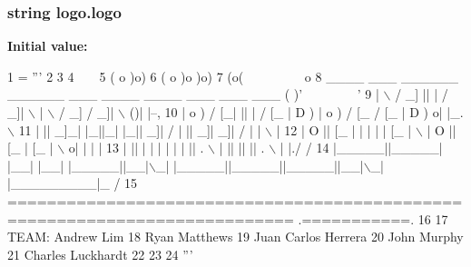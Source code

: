 \subsubsection[{logo}]{\setlength{\rightskip}{0pt plus 5cm}string logo.\+logo}\label{namespacelogo_a9117d4fd978070a512c10339dc4132ca}
{\bfseries Initial value\+:}
\begin{DoxyCode}
1 = \textcolor{stringliteral}{'''}
2 \textcolor{stringliteral}{}
3 \textcolor{stringliteral}{}
4 \textcolor{stringliteral}{                                                                                    ~  ~           }
5 \textcolor{stringliteral}{                                                                                  ( o )o)          }
6 \textcolor{stringliteral}{                                                                                ( o )o  )o)       }
7 \textcolor{stringliteral}{                                                                               (o( ~~~~~~~~~o      }
8 \textcolor{stringliteral}{      \_\_\_\_     \_\_\_ \_\_\_\_\_\_  \_\_\_\_\_\_    \_\_\_  \_\_\_\_       \_\_\_\_     \_\_\_    \_\_\_  \_\_\_  ( )' ~~~~~~~~'      }
9 \textcolor{stringliteral}{     |    \(\backslash\)   /  \_]      ||      |  /  \_]|    \(\backslash\)     |    \(\backslash\)   /  \_]  /  \_]|    \(\backslash\) ()|         |--,   }
10 \textcolor{stringliteral}{     |  o  ) /  [\_|      ||      | /  [\_ |  D  )    |  o  ) /  [\_  /  [\_ |  D  ) o|         |\_. \(\backslash\)  }
11 \textcolor{stringliteral}{     |     ||    \_]\_|  |\_||\_|  |\_||    \_]|    /     |     ||    \_]|    \_]|    /   |         |  \(\backslash\) | }
12 \textcolor{stringliteral}{     |  O  ||   [\_  |  |    |  |  |   [\_ |    \(\backslash\)     |  O  ||   [\_ |   [\_ |    \(\backslash\)  o|         |  | | }
13 \textcolor{stringliteral}{     |     ||     | |  |    |  |  |     ||  .  \(\backslash\)    |     ||     ||     ||  .  \(\backslash\)  |         |./ /  }
14 \textcolor{stringliteral}{     |\_\_\_\_\_||\_\_\_\_\_| |\_\_|    |\_\_|  |\_\_\_\_\_||\_\_|\(\backslash\)\_|    |\_\_\_\_\_||\_\_\_\_\_||\_\_\_\_\_||\_\_|\(\backslash\)\_|  |\_\_\_\_\_\_\_\_\_|\_ /   }
15 \textcolor{stringliteral}{     =========================================================================== .===========.    }
16 \textcolor{stringliteral}{}
17 \textcolor{stringliteral}{     TEAM:     Andrew Lim}
18 \textcolor{stringliteral}{               Ryan Matthews}
19 \textcolor{stringliteral}{               Juan Carlos Herrera}
20 \textcolor{stringliteral}{               John Murphy}
21 \textcolor{stringliteral}{               Charles Luckhardt}
22 \textcolor{stringliteral}{}
23 \textcolor{stringliteral}{}
24 \textcolor{stringliteral}{'''}
\end{DoxyCode}
